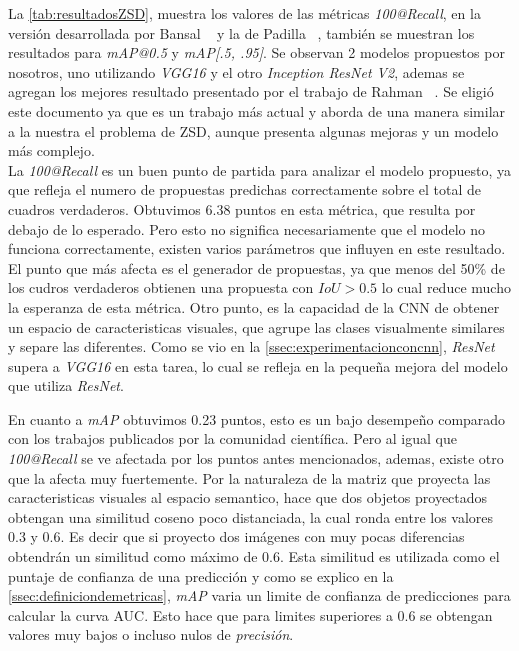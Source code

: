 La \autoref{tab:resultadosZSD}, muestra los valores de las métricas \textit{100@Recall}, en la versión desarrollada por Bansal \etal~\cite{bansal2018zero} y la de Padilla \etal~\cite{padilla2020survey}, también se muestran los resultados para \textit{mAP@0.5} y \textit{mAP[.5, .95]}. Se observan 2 modelos propuestos por nosotros, uno utilizando \textit{VGG16} y el otro \textit{Inception ResNet V2}, ademas se agregan los mejores resultado presentado por el trabajo de Rahman \etal~\cite{rahman2020zero}. Se eligió este documento ya que es un trabajo más actual y aborda de una manera similar a la nuestra el problema de ZSD, aunque presenta algunas mejoras y un modelo más complejo.\\

La \textit{100@Recall} es un buen punto de partida para analizar el modelo propuesto, ya que refleja el numero de propuestas predichas correctamente sobre el total de cuadros verdaderos. Obtuvimos 6.38 puntos en esta métrica, que resulta por debajo de lo esperado. Pero esto no significa necesariamente que el modelo no funciona correctamente, existen varios parámetros que influyen en este resultado. El punto que más afecta es el generador de propuestas, ya que menos del 50\% de los cudros verdaderos obtienen una propuesta con $IoU > 0.5$ lo cual reduce mucho la esperanza de esta métrica. Otro punto, es la capacidad de la CNN de obtener un espacio de caracteristicas visuales, que agrupe las clases visualmente similares y separe las diferentes. Como se vio en la \autoref{ssec:experimentacionconcnn}, \textit{ResNet} supera a \textit{VGG16} en esta tarea, lo cual se refleja en la pequeña mejora del modelo que utiliza  \textit{ResNet}.

En cuanto a \textit{mAP} obtuvimos 0.23 puntos, esto es un bajo desempeño comparado con los trabajos publicados por la comunidad científica. Pero al igual que \textit{100@Recall} se ve afectada por los puntos antes mencionados, ademas, existe otro que la afecta muy fuertemente. Por la naturaleza de la matriz que proyecta las caracteristicas visuales al espacio semantico, hace que dos objetos proyectados obtengan una similitud coseno poco distanciada, la cual ronda entre los valores 0.3 y 0.6. Es decir que si proyecto dos imágenes con muy pocas diferencias obtendrán un similitud como máximo de 0.6. Esta similitud es utilizada como el puntaje de confianza de una predicción y como se explico en la \autoref{ssec:definiciondemetricas}, \textit{mAP} varia un limite de confianza de predicciones para calcular la curva AUC. Esto hace que para limites superiores a 0.6 se obtengan valores muy bajos o incluso nulos de \textit{precisión}.\\
 

